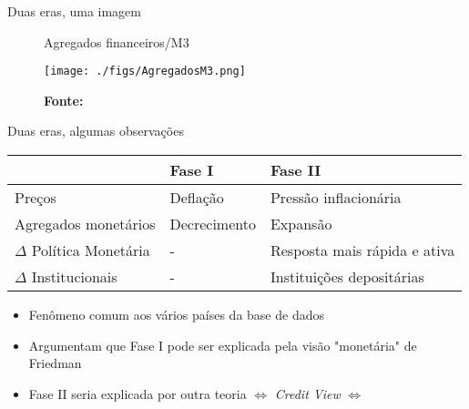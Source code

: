 \documentclass[presentation]{beamer}
\begin{document}
\begin{frame}[label={sec:org7677aea}]{Duas eras, uma imagem}
\begin{figure}[htb]
\centering
\caption{Agregados financeiros/M3} 
\texttt{[image: ./figs/AgregadosM3.png]}
\label{fig:agregados}
\caption*{\textbf{Fonte:} \textcite[p.~ 1035]{schularickCreditBoomsGone2012}}
\end{figure}
\end{frame}

\begin{frame}[label={sec:org7231322}]{Duas eras, algumas observações}
\begin{center}
\begin{tabular}{lll}
\hline
 & Fase I & Fase II\\
\hline
Preços & Deflação & Pressão inflacionária\\
Agregados monetários & Decrecimento & Expansão\\
\(\Delta\) Política Monetária & - & Resposta mais rápida e ativa\\
\(\Delta\) Institucionais & - & Instituições depositárias\\
\hline
\end{tabular}
\end{center}

\begin{itemize}
\item Fenômeno comum aos vários países da base de dados
\item Argumentam que Fase I pode ser explicada pela visão "monetária" de Friedman
\item Fase II seria explicada por outra teoria \(\Leftrightarrow\) \emph{Credit View} \(\Leftrightarrow\) \textcite{minsky_1977_Financial}
\end{itemize}
\end{frame}
\end{document}
